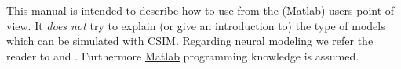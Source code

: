 This manual is intended to describe how to use \csim from the (Matlab)
users point of view. It \emph{does not} try to explain (or give an
introduction to) the type of models which can be simulated with CSIM.
Regarding neural modeling we refer the reader to \cite{DayanAbbott:01}
and \cite{GerstnerKistler:02}.  Furthermore
\href{http://www.mathworks.com}{Matlab} programming knowledge is
assumed.


